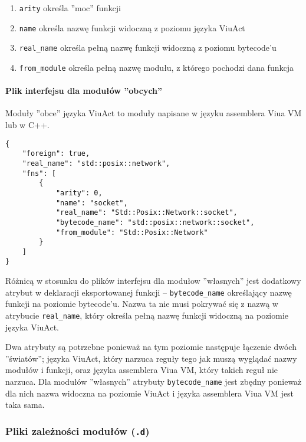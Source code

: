 \begin{enumerate}
    \item \texttt{arity} określa ''moc'' funkcji
    \item \texttt{name} określa nazwę funkcji widoczną z poziomu języka ViuAct
    \item \texttt{real\_name} określa pełną nazwę funkcji widoczną z poziomu bytecode'u
    \item \texttt{from\_module} określa pełną nazwę modułu, z którego pochodzi dana funkcja
\end{enumerate}

\paragraph{Plik interfejsu dla modułów ''obcych''}
\label{pliki_interfejsow_modulow_obcych}

Moduły ''obce'' języka ViuAct to moduły napisane w języku assemblera Viua VM lub w C++.

\begin{lstlisting}
{
    "foreign": true,
    "real_name": "std::posix::network",
    "fns": [
        {
            "arity": 0,
            "name": "socket",
            "real_name": "Std::Posix::Network::socket",
            "bytecode_name": "std::posix::network::socket",
            "from_module": "Std::Posix::Network"
        }
    ]
}
\end{lstlisting}

Różnicą w stosunku do plików interfejsu dla modułow ''własnych'' jest dodatkowy atrybut w deklaracji
eksportowanej funkcji -- \texttt{bytecode\_name} określający nazwę funkcji na poziomie bytecode'u. Nazwa ta
nie musi pokrywać się z nazwą w atrybucie \texttt{real\_name}, który określa pełną nazwę funkcji widoczną na
poziomie języka ViuAct.

Dwa atrybuty są potrzebne ponieważ na tym poziomie następuje łączenie dwóch ''światów''; języka ViuAct, który
narzuca reguły tego jak muszą wyglądać nazwy modułów i funkcji, oraz języka assemblera Viua VM, który takich
reguł nie narzuca. Dla modułów ''własnych'' atrybuty \texttt{bytecode\_name} jest zbędny ponieważ dla nich
nazwa widoczna na poziomie ViuAct i języka assemblera Viua VM jest taka sama.

\subsubsection{Pliki zależności modułów (\texttt{.d})}
\label{pliki_zaleznosci_modulow}

